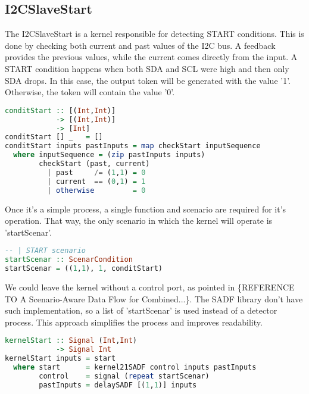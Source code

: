 \documentclass{article}
\begin{document}
\subsection{I2CSlaveStart}

The I2CSlaveStart is a kernel responsible for detecting START conditions. This is done by checking both current and past values of the I2C bus. A feedback provides the previous values, while the current comes directly from the input.
A START condition happens when both SDA and SCL were high and then only SDA drops. In this case, the output token will be generated with the value '1'. Otherwise, the token will contain the value '0'.
\begin{lstlisting}[frame=single, basicstyle=\small, language={Haskell}, caption={START condition detector in Haskell}, captionpos=b, label={func-behaviour}]
conditStart :: [(Int,Int)]
            -> [(Int,Int)]
            -> [Int]
conditStart [] _   = []
conditStart inputs pastInputs = map checkStart inputSequence
  where inputSequence = (zip pastInputs inputs)
        checkStart (past, current)
          | past     /= (1,1) = 0
          | current  == (0,1) = 1
          | otherwise         = 0
\end{lstlisting}

Once it's a simple process, a single function and scenario are required for it's operation. That way, the only scenario in which the kernel will operate is 'startScenar'.
\begin{lstlisting}[frame=single, basicstyle=\small, language={Haskell}, caption={Unique START condition scenario}, captionpos=b]
-- | START scenario
startScenar :: ScenarCondition
startScenar = ((1,1), 1, conditStart)
\end{lstlisting}

We could leave the kernel without a control port, as pointed in \{REFERENCE TO A Scenario-Aware Data Flow for Combined...\}. The SADF library don't have such implementation, so a list of 'startScenar' is used instead of a detector process. This approach simplifies the process and improves readability.
\begin{lstlisting}[frame=single, basicstyle=\small, language={Haskell}, caption={START condition kernel with constant scenario}, captionpos=b]
kernelStart :: Signal (Int,Int)
            -> Signal Int
kernelStart inputs = start
  where start      = kernel21SADF control inputs pastInputs
        control    = signal (repeat startScenar)
        pastInputs = delaySADF [(1,1)] inputs
\end{lstlisting}
\end{document}
